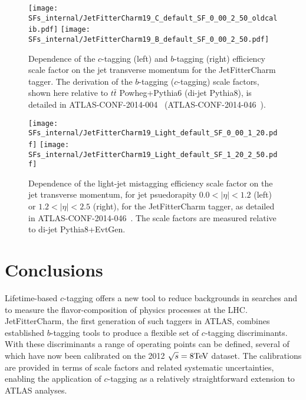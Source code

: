 \newcommand{\lSF}{as detailed in ATLAS-CONF-2014-046~\cite{bc2014}. The scale factors are measured relative to di-jet Pythia8+EvtGen.} %
\newcommand{\cSF}{as detailed in ATLAS-CONF-2014-046~\cite{bc2014}. The scale factors are measured relative to di-jet Pythia8.} %
\newcommand{\bSF}{as detailed in ATLAS-CONF-2014-004~\cite{Giacinto}. The scale factors are measured relative to $t \bar{t}$ Powheg+Pythia6.} %

\begin{figure}[!h]
  \centering
  \texttt{[image: SFs\_internal/JetFitterCharm19\_C\_default\_SF\_0\_00\_2\_50\_oldcalib.pdf]}
  \texttt{[image: SFs\_internal/JetFitterCharm19\_B\_default\_SF\_0\_00\_2\_50.pdf]}
  \caption{Dependence of the $c$-tagging (left) and $b$-tagging (right) efficiency scale factor on the jet transverse momentum for the JetFitterCharm tagger. The derivation of the $b$-tagging ($c$-tagging) scale factors, shown here relative to $t \bar{t}$ Powheg+Pythia6 (di-jet Pythia8), is detailed in ATLAS-CONF-2014-004~\cite{Giacinto} (ATLAS-CONF-2014-046~\cite{bc2014}).}
  \label{tag:JFC_SF_B}
\end{figure}

\begin{figure}[!htb]
  \centering
  \texttt{[image: SFs\_internal/JetFitterCharm19\_Light\_default\_SF\_0\_00\_1\_20.pdf]}
  \texttt{[image: SFs\_internal/JetFitterCharm19\_Light\_default\_SF\_1\_20\_2\_50.pdf]}
  \caption{Dependence of the light-jet mistagging efficiency scale factor on the jet transverse momentum, for jet psuedorapity $0.0 < | \eta | < 1.2$ (left) or $1.2 < | \eta | < 2.5$ (right), for the JetFitterCharm tagger, \lSF}
  
  \label{tag:JFC_SF_L1}
\end{figure}


\section{Conclusions}
\label{tag:sec:concl}

Lifetime-based $c$-tagging offers a new tool to reduce backgrounds in searches and to measure the flavor-composition of physics processes at the LHC. JetFitterCharm, the first generation of such taggers in ATLAS, combines established $b$-tagging tools to produce a flexible set of $c$-tagging discriminants. With these discriminants a range of operating points can be defined, several of which have now been calibrated on the 2012 $\sqrt{s} = 8 \text{TeV}$ dataset. The calibrations are provided in terms of scale factors and related systematic uncertainties, enabling the application of $c$-tagging as a relatively straightforward extension to ATLAS analyses.

